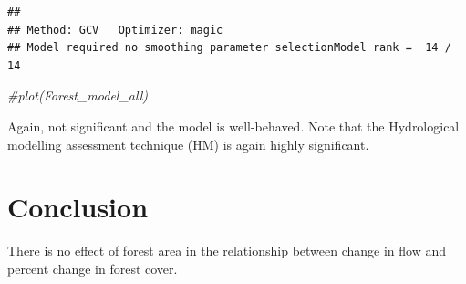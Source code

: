 \documentclass[]{elsarticle} %
\newenvironment{Shaded}{\begin{snugshade}}{\end{snugshade}}
\newcommand{\CommentTok}[1]{\textcolor[rgb]{0.56,0.35,0.01}{\textit{#1}}}
\begin{document}
\begin{verbatim}
## 
## Method: GCV   Optimizer: magic
## Model required no smoothing parameter selectionModel rank =  14 / 14
\end{verbatim}

\begin{Shaded}
\begin{Highlighting}[]
\CommentTok{\#plot(Forest\_model\_all)}
\end{Highlighting}
\end{Shaded}

Again, not significant and the model is well-behaved. Note that the Hydrological modelling assessment technique (HM) is again highly significant.

\hypertarget{conclusion}{%
\section{Conclusion}\label{conclusion}}

There is no effect of forest area in the relationship between change in flow and percent change in forest cover.


\end{document}
